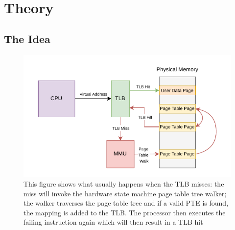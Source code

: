 \chapter{Theory}
\label{chap:theory}



\section{The Idea}



\begin{figure}[ht!]
    \centering
    \includegraphics[scale=1.5]{figures/theory_normal_tlb_miss.pdf}
    \caption[Usual TLB Miss]{This figure shows what usually happens when the TLB misses:
        the miss will invoke the hardware state machine page table tree walker; the walker traverses
        the page table tree and if a valid PTE is found, the mapping is added to the TLB. The processor
        then executes the failing instruction again which will then result in a TLB hit}
    \label{fig:theory:normal_tlb_miss}
\end{figure}


